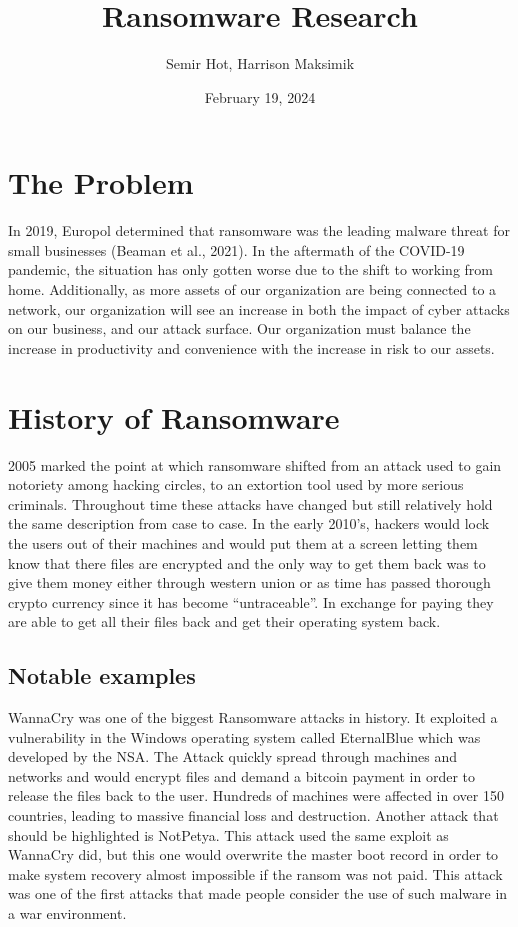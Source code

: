 \documentclass[11pt]{article}
\author{Semir Hot, Harrison Maksimik}
\date{February 19, 2024}
\title{Ransomware Research}
\begin{document}
\maketitle
\tableofcontents

\section{The Problem}
\label{sec:org7a7e22f}
In 2019, Europol determined that ransomware was the leading malware threat for small businesses (Beaman et al., 2021). In the aftermath of the COVID-19 pandemic, the situation has only gotten worse due to the shift to working from home. Additionally, as more assets of our organization are being connected to a network, our organization will see an increase in both the impact of cyber attacks on our business, and our attack surface. Our organization must balance the increase in productivity and convenience with the increase in risk to our assets.

\section{History of Ransomware}
\label{sec:org72d90c0}
2005 marked the point at which ransomware shifted from an attack used to gain notoriety among hacking circles, to an extortion tool used by more serious criminals. Throughout time these attacks have changed but still relatively hold the same description from case to case. In the early 2010’s, hackers would lock the users out of their machines and would put them at a screen letting them know that there files are encrypted and the only way to get them back was to give them money either through western union or as time has passed thorough crypto currency since it has become “untraceable”. In exchange for paying they are able to get all their files back and get their operating system back.

\subsection{Notable examples}
\label{sec:org6b89ec8}
WannaCry was one of the biggest Ransomware attacks in history. It exploited a vulnerability in the Windows operating system called EternalBlue which was developed by the NSA. The Attack quickly spread through machines and networks and would encrypt files and demand a bitcoin payment in order to release the files back to the user. Hundreds of machines were affected in over 150 countries, leading to massive financial loss and destruction. Another attack that should be highlighted is NotPetya. This attack used the same exploit as WannaCry did, but this one would overwrite the master boot record in order to make system recovery almost impossible if the ransom was not paid. This attack was one of the first attacks that made people consider the use of such malware in a war environment.
\end{document}
